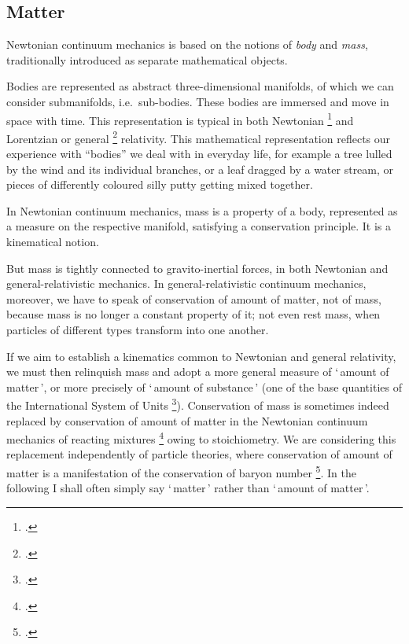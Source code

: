 \documentclass[\ifafour a4paper,12pt,\else a5paper,10pt,\fi%
onecolumn,oneside,article,%
british%
]{memoir}
\newcommand*{\defquote}[1]{`\,#1\,'}
\theoremstyle{remark}
\theoremstyle{innote}
\newcommand*{\citep}{\footcites}
\renewcommand*{\|}[1][]{\nonscript\,#1\vert\nonscript\;\mathopen{}}
\newcommand*{\sect}{\S}%
\newcommand*{\sects}{\S\S}%
\newcommand*{\eqn}{eq.}%
\newcommand*{\eg}{{e.g.}}
\newcommand*{\ie}{{i.e.}}
\newcommand*{\cf}{{cf.}}
\begin{document}
\subsection{Matter}
\label{sec:matter}


Newtonian continuum mechanics is based on the notions of \emph{body} and
\emph{mass}, traditionally introduced as separate mathematical objects.

Bodies are represented as abstract three-dimensional manifolds, of which we
can consider submanifolds, \ie\ sub-bodies. These bodies are immersed and
move in space with time. This representation is typical in both Newtonian
\citep[\sects~I.2--3]{truesdell1977_r1991}{noll1959,noll1973} and
Lorentzian or general \citep{grotetal1966,carteretal1972} relativity. This
mathematical representation reflects our experience with \enquote{bodies}
we deal with in everyday life, for example a tree lulled by the wind and
its individual branches, or a leaf dragged by a water stream, or pieces of
differently coloured silly putty getting mixed together.

In Newtonian continuum mechanics, mass is a property of a body, represented
as a measure on the respective manifold, satisfying a conservation
principle. It is a kinematical notion.

But mass is tightly connected to gravito-inertial forces, in both Newtonian
and general-relativistic mechanics. In general-relativistic continuum
mechanics, moreover, we have to speak of conservation of amount of matter,
not of mass, because mass is no longer a constant property of it; not even
rest mass, when particles of different types transform into one another.

If we aim to establish a kinematics common to Newtonian and general
relativity, we must then relinquish mass and adopt a more general measure
of \defquote{amount of matter}, or more precisely of \defquote{amount of
  substance} (one of the base quantities of the International System of
Units \citep{iso2009,iso2009d,jcgm1997_r2012}). Conservation of mass is
sometimes indeed replaced by conservation of amount of matter in the
Newtonian continuum mechanics of reacting mixtures \citep[\eg][(see
especially \eqn~(7), where $m$ can be dropped)]{eckart1940b}[Lect.~6 (in
\eqn~(6.1) $\rho$ can be dropped)]{truesdell1969_r1984}[\sects~4.1--4.2 and
refs therein]{samohyletal1987_r2014} %
owing to stoichiometry. We are considering this replacement independently
of particle theories, where conservation of amount of matter is a
manifestation of the conservation of baryon number
\citep[\cf][\sect~22.2]{misneretal1970_r1973}. In the following I shall
often simply say \defquote{matter} rather than \defquote{amount of matter}.
\end{document}
